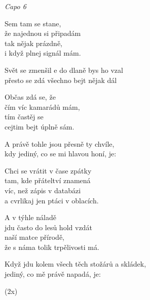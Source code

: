 
\re{}
\textit{Capo 6}

\ve{}
Sem tam se stane,\\
že najednou si připadám\\
tak nějak prázdně,\\
i když plnej signál mám.

Svět se zmenšil e do dlaně bys ho vzal \\ 
přesto se zdá všechno bejt nějak dál 

\ve{}
Občas zdá se, že\\
čím víc kamarádů mám,\\
tím častěj se\\
cejtim bejt úplně sám. 

A právě tohle jsou přesně ty chvíle,\\
kdy jediný, co se mi hlavou honí, je:  

\cho{}
Chci se vrátit v čase zpátky\\
tam, kde přáteltví znamená\\
víc, než zápis v databázi\\
a cvrlikaj jen ptáci v oblacích.

\ve{}
A v týhle náladě\\
jdu často do lesů hold vzdát\\
naší matce přírodě,\\
že s náma tolik trpělivosti má.

Když jdu kolem všech těch stožárů a skládek,\\
jediný, co mě právě napadá, je: 

\cho{}
(2x)

\esong